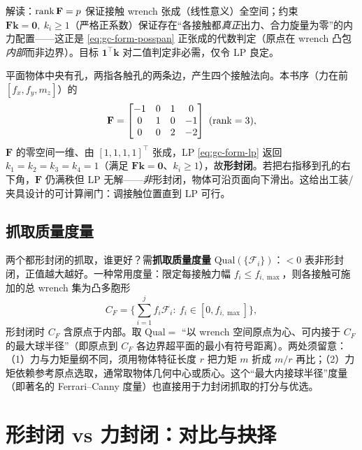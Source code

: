 \noindent 解读：$\operatorname{rank}\mathbf{F}=p$ 保证接触 wrench 张成（线性意义）全空间；约束 $\mathbf{F}\mathbf{k}=\mathbf{0},\ k_i\ge1$（严格正系数）保证存在“各接触都\emph{真正}出力、合力旋量为零”的内力配置——这正是 \cref{eq:gc-form-posspan} 正张成的代数判定（原点在 wrench 凸包\emph{内部}而非边界）。目标 $\mathbf{1}^\top\mathbf{k}$ 对二值判定非必需，仅令 LP 良定。

\begin{example}[内孔双指抓取的 LP 判定]
\label{ex:gc-form-lp}
平面物体中央有孔，两指各触孔的两条边，产生四个接触法向\cite{lynch2017modern}。本书序（力在前 $[f_x,f_y,m_z]$）的
\[
  \mathbf{F}=\begin{bmatrix}-1&0&1&0\\ 0&1&0&-1\\ 0&0&2&-2\end{bmatrix}\ (\rank=3),
\]
$\mathbf{F}$ 的零空间一维、由 $[1,1,1,1]^\top$ 张成，LP \cref{eq:gc-form-lp} 返回 $k_1=k_2=k_3=k_4=1$（满足 $\mathbf{F}\mathbf{k}=\mathbf{0}$、$k_i\ge1$），故\textbf{形封闭}。若把右指移到孔的右下角，$\mathbf{F}$ 仍满秩但 LP 无解——\emph{非}形封闭，物体可沿页面向下滑出。这给出工装/夹具设计的可计算闸门：调接触位置直到 LP 可行。
\end{example}

\subsection{抓取质量度量}
\label{sec:gc-fc-quality}

两个都形封闭的抓取，谁更好？需\textbf{抓取质量度量} $\mathrm{Qual}(\{\mathcal{F}_i\})$：$<0$ 表非形封闭，正值越大越好。一种常用度量：限定每接触力幅 $f_i\le f_{i,\max}$，则各接触可施加的总 wrench 集为凸多胞形
\begin{equation}
  C_F=\Big\{\sum_{i=1}^{j}f_i\mathcal{F}_i:\ f_i\in[0,f_{i,\max}]\Big\},
  \label{eq:gc-quality-polytope}
\end{equation}
形封闭时 $C_F$ 含原点于内部。取 $\mathrm{Qual}=$ “以 wrench 空间原点为心、可内接于 $C_F$ 的最大球半径”（即原点到 $C_F$ 各边界超平面的最小有符号距离）\cite{ferrari1992,lynch2017modern}。两处须留意：（1）力与力矩量纲不同，须用物体特征长度 $r$ 把力矩 $m$ 折成 $m/r$ 再比；（2）力矩依赖参考原点选取，通常取物体几何中心或质心。这个“最大内接球半径”度量（即著名的 Ferrari–Canny 度量）也直接用于力封闭抓取的打分与优选。

\section{形封闭 vs 力封闭：对比与抉择}
\label{sec:gc-compare}

